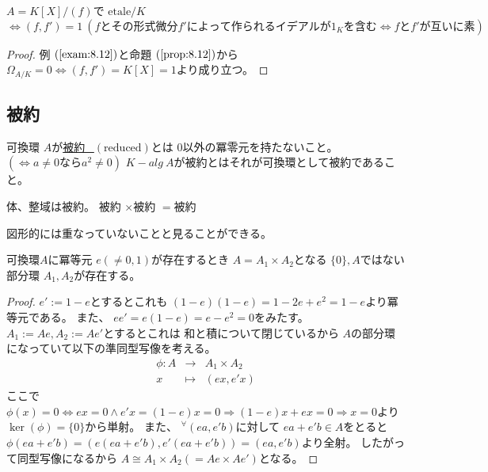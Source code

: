 \documentclass[../master_galois_theory]{subfiles}
\begin{document}
\begin{corl} \label{corl:8.12}
  $A = K[X]/(f)$で $\mathrm{etale}/K$ $\Leftrightarrow (f,f') = 1 \  (fとその形式微分 f'によって作られるイデアルが 1_Kを含む \Leftrightarrow fとf'が互いに素)$
\end{corl}

\begin{proof}
  例 $(\mathrm{\ref{exam:8.12}})$と命題 $(\mathrm{\ref{prop:8.12}})$から
  $\Omega_{A/K} = 0 \Leftrightarrow  (f,f') = K[X] = 1$より成り立つ。
\end{proof}

\subsection{被約}

\begin{defi}
  可換環 $A$が\underline{被約 \  $(\mathrm{reduced})$}とは
  $0$以外の冪零元を持たないこと。 $(\Leftrightarrow a \neq 0 なら a^2 \neq 0)$
  $K-alg \  A$が被約とはそれが可換環として被約であること。
\end{defi}

\begin{exam}
  体、整域は被約。
  被約 $\times$被約 $=$被約

  図形的には重なっていないことと見ることができる。
\end{exam}

\begin{lemm} \label{lemm:idempotent}
  可換環$A$に冪等元 $e (\neq 0 , 1)$が存在するとき
  $A = A_1 \times A_2$となる $\{ 0 \} , A$ではない
  部分環 $A_1 , A_2$が存在する。
\end{lemm}

\begin{proof}
  $e' := 1 - e$とするとこれも
  $(1 - e)(1 - e) = 1 - 2e + e^2 = 1 - e$より冪等元である。
  また、 $e e' = e (1 - e) = e - e^2 = 0$をみたす。
  $A_1 := Ae , A_2 := Ae'$とするとこれは 和と積について閉じているから
  $A$の部分環になっていて以下の準同型写像を考える。
  \begin{eqnarray*}
    \phi : A & \longrightarrow & A_1 \times A_2 \\
    x & \longmapsto & (ex , e'x)
  \end{eqnarray*}
  ここで $\phi(x) = 0 \Leftrightarrow ex = 0 \land e'x = (1 - e)x = 0 \Rightarrow (1 - e)x + ex = 0 \Rightarrow x = 0$より $\ker(\phi) = \{ 0 \}$から単射。
  また、 ${}^\forall (ea , e'b)$に対して
  $ea + e'b \in A$をとると
  $\phi(ea + e'b) = (e(ea + e'b) , e'(ea + e'b) ) = (ea , e'b)$より全射。
  したがって同型写像になるから $A \cong A_1 \times A_2 (= Ae \times Ae')$となる。
\end{proof}
\end{document}
